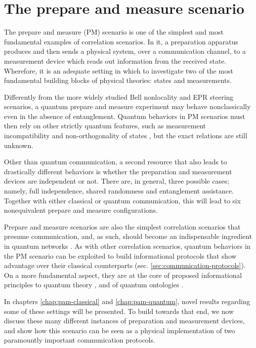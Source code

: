 \chapter{The prepare and measure scenario}
\label{chap:pam}

    The prepare and measure (PM) scenario is one of the simplest and most fundamental examples of correlation scenarios. In it, a preparation apparatus produces and then sends a physical system, over a communication channel, to a measurement device which reads out information from the received state. Wherefore, it is an adequate setting in which to investigate two of the most fundamental building blocks of physical theories: states and measurements.

    Differently from the more widely studied Bell nonlocality and EPR steering scenarios, a quantum prepare and measure experiment may behave nonclassically even in the absence of entanglement. Quantum behaviors in PM scenarios must then rely on other strictly quantum features, such as measurement incompatibility \cite{carmeli_racsincompatibility_2020} and non-orthogonality of states \cite{brunner_dimension_2013}, but the exact relations are still unknown.

    Other than quantum communication, a second resource that also leads to drastically different behaviors is whether the preparation and measurement devices are independent or not. There are, in general, three possible cases; namely, full independence, shared randomness and entanglement assistance. Together with either classical or quantum communication, this will lead to six nonequivalent prepare and measure configurations.

    Prepare and measure scenarios are also the simplest correlation scenarios that presume communication, and, as such, should become an indispensable ingredient in quantum networks \cite{bowles_pamnetworks_2015,poderini_pamcriteria_2020}. As with other correlation scenarios, quantum behaviors in the PM scenario can be exploited to build informational protocols that show advantage over their classical counterparts (sec. \ref{sec:communication-protocols}). On a more fundamental aspect, they are at the core of proposed informational principles to quantum theory \cite{pawlowski_infocausality_2009,pawlowski_infocausalityreview_2011}, and of quantum ontologies \cite{spekkens_2005_contextuality}.

    In chapters \ref{chap:pam-classical} and \ref{chap:pam-quantum}, novel results regarding some of these settings will be presented. To build towards that end, we now discuss these many different instances of preparation and measurement devices, and show how this scenario can be seen as a physical implementation of two paramountly important communication protocols.

